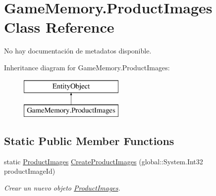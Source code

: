 \hypertarget{class_game_memory_1_1_product_images}{\section{Game\-Memory.\-Product\-Images Class Reference}
\label{class_game_memory_1_1_product_images}
}


No hay documentación de metadatos disponible.  


Inheritance diagram for Game\-Memory.\-Product\-Images\-:\begin{figure}[H]
\begin{center}
\leavevmode
\includegraphics[height=2.000000cm]{class_game_memory_1_1_product_images}
\end{center}
\end{figure}
\subsection*{Static Public Member Functions}
\begin{DoxyCompactItemize}
\item 
static \hyperlink{class_game_memory_1_1_product_images}{Product\-Images} \hyperlink{class_game_memory_1_1_product_images_a28d6bdf672f7810dab416e5e3cd3dd86}{Create\-Product\-Images} (global\-::\-System.\-Int32 product\-Image\-Id)
\begin{DoxyCompactList}\small\item\em Crear un nuevo objeto \hyperlink{class_game_memory_1_1_product_images}{Product\-Images}. \end{DoxyCompactList}\end{DoxyCompactItemize}
